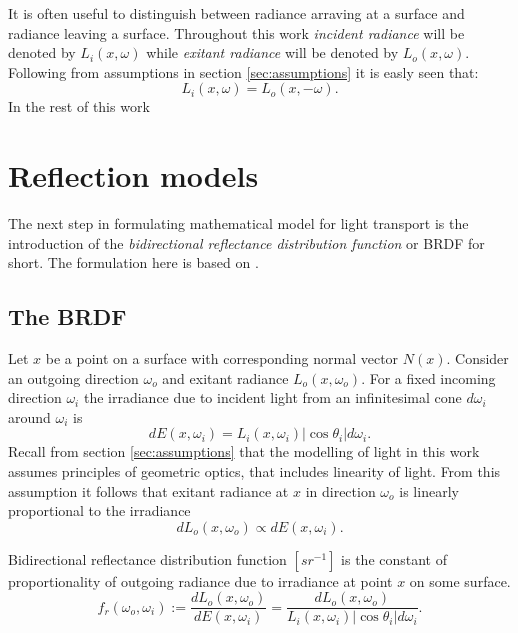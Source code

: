 It is often useful to distinguish between radiance arraving at a surface and radiance leaving a surface. Throughout this work \emph{incident radiance} will be denoted by $L_{i}(x, \omega)$ while \emph{exitant radiance} will be denoted by $L_{o}(x, \omega)$. Following from assumptions in section \ref{sec:assumptions} it is easly seen that:
\begin{equation}
  L_{i}(x, \omega) = L_{o}(x, -\omega).
\end{equation}
In the rest of this work 

\section{Reflection models}
The next step in formulating mathematical model for light transport is the introduction of the \emph{bidirectional reflectance distribution function} or BRDF for short. The formulation here is based on \cite{veach97}.

\subsection{The BRDF}
Let $x$ be a point on a surface with corresponding normal vector $N(x)$. Consider an outgoing direction $\omega_{o}$ and exitant radiance $L_{o}(x, \omega_{o})$. For a fixed incoming direction $\omega_{i}$ the irradiance due to incident light from an infinitesimal cone $d\omega_{i}$ around $\omega_{i}$ is
\begin{equation}
  dE(x, \omega_{i}) = L_{i}(x, \omega_{i}) |\cos\theta_{i}| d\omega_{i}.
\end{equation}
Recall from section \ref{sec:assumptions} that the modelling of light in this work assumes principles of geometric optics, that includes linearity of light. From this assumption it follows that exitant radiance at $x$ in direction $\omega_{o}$ is linearly proportional to the irradiance
\begin{equation}
  dL_{o}(x, \omega_{o}) \propto dE(x, \omega_{i}).
\end{equation}

\begin{df}[BRDF]
Bidirectional reflectance distribution function $[sr^{-1}]$ is the constant of proportionality of outgoing radiance due to irradiance at point $x$ on some surface.
\begin{equation}
  f_{r}(\omega_{o}, \omega_{i}) := \frac{dL_{o}(x, \omega_{o})}{dE(x, \omega_{i})} = \frac{dL_{o}(x, \omega_{o})}{L_{i}(x, \omega_{i}) |\cos\theta_{i}| d\omega_{i}}.
\end{equation}
\end{df}

